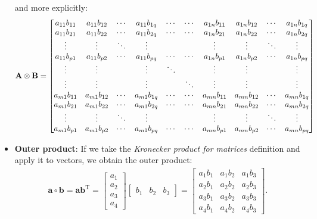 \begin{itemize}
        and more explicitly: 
        \begin{align*}
\centering
   \mathbf{A}\otimes\mathbf{B} = \begin{bmatrix}
   a_{11} b_{11} & a_{11} b_{12} & \cdots & a_{11} b_{1q} &
                   \cdots & \cdots & a_{1n} b_{11} & a_{1n} b_{12} & \cdots & a_{1n} b_{1q} \\
   a_{11} b_{21} & a_{11} b_{22} & \cdots & a_{11} b_{2q} &
                   \cdots & \cdots & a_{1n} b_{21} & a_{1n} b_{22} & \cdots & a_{1n} b_{2q} \\
   \vdots & \vdots & \ddots & \vdots & & & \vdots & \vdots & \ddots & \vdots \\
   a_{11} b_{p1} & a_{11} b_{p2} & \cdots & a_{11} b_{pq} &
                   \cdots & \cdots & a_{1n} b_{p1} & a_{1n} b_{p2} & \cdots & a_{1n} b_{pq} \\
   \vdots & \vdots & & \vdots & \ddots & & \vdots & \vdots & & \vdots \\
   \vdots & \vdots & & \vdots & & \ddots & \vdots & \vdots & & \vdots \\
   a_{m1} b_{11} & a_{m1} b_{12} & \cdots & a_{m1} b_{1q} &
                   \cdots & \cdots & a_{mn} b_{11} & a_{mn} b_{12} & \cdots & a_{mn} b_{1q} \\
   a_{m1} b_{21} & a_{m1} b_{22} & \cdots & a_{m1} b_{2q} &
                   \cdots & \cdots & a_{mn} b_{21} & a_{mn} b_{22} & \cdots & a_{mn} b_{2q} \\
   \vdots & \vdots & \ddots & \vdots & & & \vdots & \vdots & \ddots & \vdots \\
   a_{m1} b_{p1} & a_{m1} b_{p2} & \cdots & a_{m1} b_{pq} &
                   \cdots & \cdots & a_{mn} b_{p1} & a_{mn} b_{p2} & \cdots & a_{mn} b_{pq}
\end{bmatrix} 
\end{align*}
        
    
    \item \textbf{Outer product}: If we take the \emph{Kronecker product for matrices} definition and apply it to vectors, we obtain the outer product: \\
        
        \begin{align}
            \mathbf{a} \circ \mathbf{b} = \mathbf{a} \mathbf{b}^\mathrm{T}
            = \begin{bmatrix}a_1 \\ a_2 \\ a_3 \\ a_4\end{bmatrix}
            \begin{bmatrix}b_1 & b_2 & b_3\end{bmatrix}
            = \begin{bmatrix}a_1b_1 & a_1b_2 & a_1b_3 \\ a_2b_1 & a_2b_2 & a_2b_3 \\ a_3b_1 & a_3b_2 & a_3b_3 \\ a_4b_1 & a_4b_2 & a_4b_3\end{bmatrix}.
        \end{align}


\end{itemize}

